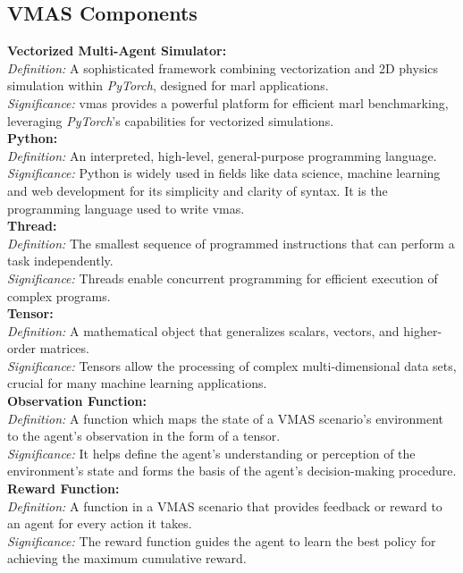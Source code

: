 \documentclass[12pt,a4paper,openright,twoside]{book}
\begin{document}
\subsection{VMAS Components}

\textbf{Vectorized Multi-Agent Simulator:}\\
\textit{Definition:} A sophisticated framework combining vectorization and 2D physics simulation within \emph{PyTorch}, designed for \ac{marl} applications.\\
\textit{Significance:} \ac{vmas} provides a powerful platform for efficient \ac{marl} benchmarking, leveraging \emph{PyTorch}'s capabilities for vectorized simulations.\\

\textbf{Python:}\\
\textit{Definition:} An interpreted, high-level, general-purpose programming language.\\
\textit{Significance:} Python is widely used in fields like data science, machine learning and web development for its simplicity and clarity of syntax. It is the programming language used to write \ac{vmas}.\\

\textbf{Thread:}\\
\textit{Definition:} The smallest sequence of programmed instructions that can perform a task independently.\\
\textit{Significance:} Threads enable concurrent programming for efficient execution of complex programs.\\

\textbf{Tensor:}\\
\textit{Definition:} A mathematical object that generalizes scalars, vectors, and higher-order matrices.\\
\textit{Significance:} Tensors allow the processing of complex multi-dimensional data sets, crucial for many machine learning applications.\\

\textbf{Observation Function:}\\
\textit{Definition:} A function which maps the state of a VMAS scenario's environment to the agent's observation in the form of a tensor.\\
\textit{Significance:} It helps define the agent’s understanding or perception of the environment's state and forms the basis of the agent's decision-making procedure.\\

\textbf{Reward Function:}\\
\textit{Definition:} A function in a VMAS scenario that provides feedback or reward to an agent for every action it takes.\\
\textit{Significance:} The reward function guides the agent to learn the best policy for achieving the maximum cumulative reward.\\
\end{document}
